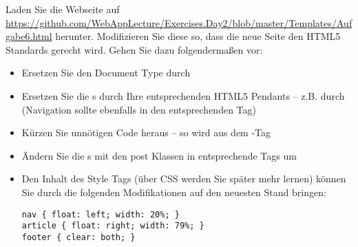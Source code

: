 %
\par Laden Sie die Webseite auf
\url{https://github.com/WebAppLecture/Exercises.Day2/blob/master/Templates/Aufgabe6.html} herunter. Modifizieren Sie
diese so, dass die neue Seite den HTML5 Standards gerecht wird. Gehen Sie dazu
folgendermaßen vor:
%
\begin{itemize}
\item
Ersetzen Sie den Document Type durch 
\item
Ersetzen Sie die s durch Ihre entsprechenden HTML5 Pendants – z.B.
 durch  (Navigation sollte ebenfalls in den
entsprechenden Tag)
\item
Kürzen Sie unnötigen Code heraus – so wird aus dem -Tag 
\item
Ändern Sie die s mit den post Klassen in entsprechende 
Tags um
\item
Den Inhalt des Style Tags (über CSS werden Sie später mehr lernen) können Sie
durch die folgenden Modifikationen auf den neuesten Stand bringen:
%
\begin{lstlisting}
nav { float: left; width: 20%; }
article { float: right; width: 79%; }
footer { clear: both; }
\end{lstlisting}
%
\end{itemize}